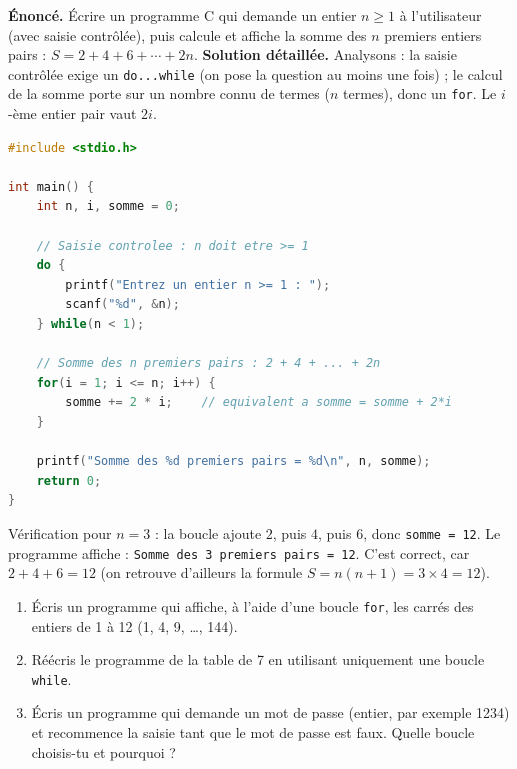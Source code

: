 \documentclass[11pt]{article}
\begin{document}
\begin{exoresolu}
\textbf{Énoncé.} Écrire un programme C qui demande un entier $n \geq 1$ à l'utilisateur (avec saisie contrôlée), puis calcule et affiche la somme des $n$ premiers entiers pairs : $S = 2 + 4 + 6 + \cdots + 2n$.
\tcblower
\textbf{Solution détaillée.} Analysons : la saisie contrôlée exige un \texttt{do...while} (on pose la question au moins une fois) ; le calcul de la somme porte sur un nombre connu de termes ($n$ termes), donc un \texttt{for}. Le $i$-ème entier pair vaut $2i$.
\begin{lstlisting}[language=C]
#include <stdio.h>

int main() {
    int n, i, somme = 0;

    // Saisie controlee : n doit etre >= 1
    do {
        printf("Entrez un entier n >= 1 : ");
        scanf("%d", &n);
    } while(n < 1);

    // Somme des n premiers pairs : 2 + 4 + ... + 2n
    for(i = 1; i <= n; i++) {
        somme += 2 * i;    // equivalent a somme = somme + 2*i
    }

    printf("Somme des %d premiers pairs = %d\n", n, somme);
    return 0;
}
\end{lstlisting}
Vérification pour $n = 3$ : la boucle ajoute $2$, puis $4$, puis $6$, donc \texttt{somme = 12}. Le programme affiche : \texttt{Somme des 3 premiers pairs = 12}. C'est correct, car $2 + 4 + 6 = 12$ (on retrouve d'ailleurs la formule $S = n(n+1) = 3 \times 4 = 12$).
\end{exoresolu}

\begin{exercice}
\begin{enumerate}
\item Écris un programme qui affiche, à l'aide d'une boucle \texttt{for}, les carrés des entiers de 1 à 12 (1, 4, 9, \dots, 144).
\item Réécris le programme de la table de 7 en utilisant uniquement une boucle \texttt{while}.
\item Écris un programme qui demande un mot de passe (entier, par exemple 1234) et recommence la saisie tant que le mot de passe est faux. Quelle boucle choisis-tu et pourquoi ?
\end{enumerate}
\end{exercice}
\end{document}
